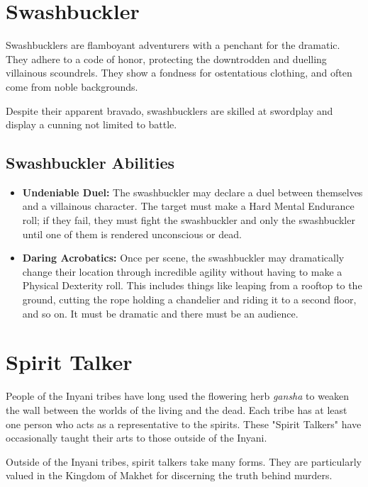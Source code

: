 \begin{multicols}{2}
\section{Swashbuckler}

Swashbucklers are flamboyant adventurers with a penchant for the dramatic.
They adhere to a code of honor, protecting the downtrodden and duelling
villainous scoundrels. They show a fondness for ostentatious clothing, and
often come from noble backgrounds.

Despite their apparent bravado, swashbucklers are skilled at swordplay and
display a cunning not limited to battle.

\subsection{Swashbuckler Abilities}

\begin{itemize}
    \item \textbf{Undeniable Duel:} The swashbuckler may declare a duel between
    themselves and a villainous character. The target must make a Hard Mental
    Endurance roll; if they fail, they must fight the swashbuckler and only the
    swashbuckler until one of them is rendered unconscious or dead.
    \item \textbf{Daring Acrobatics:} Once per scene, the swashbuckler may
    dramatically change their location through incredible agility without having
    to make a Physical Dexterity roll. This includes things like leaping from a
    rooftop to the ground, cutting the rope holding a chandelier and riding it to
    a second floor, and so on. It must be dramatic and there must be an audience.
\end{itemize}

\section{Spirit Talker}

People of the Inyani tribes have long used the flowering herb \textit{gansha} 
to weaken the wall between the worlds of the living and the dead. Each tribe
has at least one person who acts as a representative to the spirits. These
"Spirit Talkers" have occasionally taught their arts to those outside of the
Inyani.

Outside of the Inyani tribes, spirit talkers take many forms. They are 
particularly valued in the Kingdom of Makhet for discerning the truth 
behind murders.


\end{multicols}
